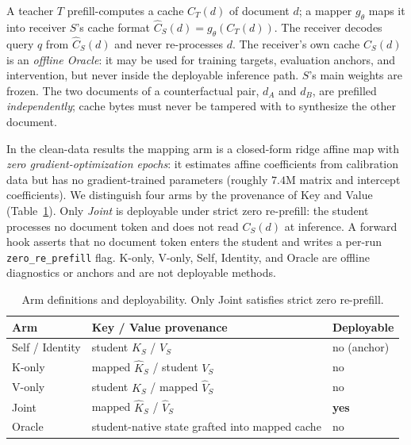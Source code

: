 \documentclass[11pt,twocolumn]{article}
\begin{document}
A teacher $T$ prefill-computes a cache $C_T(d)$ of document $d$; a mapper
$g_\theta$ maps it into receiver $S$'s cache format
$\hat{C}_S(d)=g_\theta(C_T(d))$. The receiver decodes query $q$ from
$\hat{C}_S(d)$ and never re-processes $d$. The receiver's own cache $C_S(d)$ is
an \emph{offline Oracle}: it may be used for training targets, evaluation
anchors, and intervention, but never inside the deployable inference path.
$S$'s main weights are frozen. The two documents of a counterfactual pair,
$d_A$ and $d_B$, are prefilled \emph{independently}; cache bytes must never be
tampered with to synthesize the other document.

In the clean-data results the mapping arm is a closed-form ridge affine map
with \emph{zero gradient-optimization epochs}: it estimates affine coefficients
from calibration data but has no gradient-trained parameters (roughly $7.4$M
matrix and intercept coefficients). We distinguish four
arms by the provenance of Key and Value (Table~\ref{tab:arms}). Only \emph{Joint}
is deployable under strict zero re-prefill: the student processes no document
token and does not read $C_S(d)$ at inference. A forward hook asserts that no
document token enters the student and writes a per-run
\texttt{zero\_re\_prefill} flag. K-only, V-only, Self, Identity, and Oracle are
offline diagnostics or anchors and are not deployable methods.

\begin{table}[t]
\centering
\caption{Arm definitions and deployability. Only Joint satisfies strict zero
re-prefill.}
\label{tab:arms}
\begin{tabular}{lll}
\toprule
Arm & Key / Value provenance & Deployable \\
\midrule
Self / Identity & student $K_S$ / $V_S$ & no (anchor) \\
K-only & mapped $\hat{K}_S$ / student $V_S$ & no \\
V-only & student $K_S$ / mapped $\hat{V}_S$ & no \\
Joint & mapped $\hat{K}_S$ / $\hat{V}_S$ & \textbf{yes} \\
Oracle & student-native state grafted into mapped cache & no \\
\bottomrule
\end{tabular}
\end{table}
\end{document}
